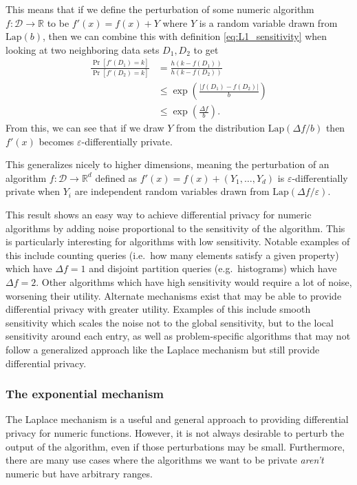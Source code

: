 \documentclass[a4paper,12pt]{article}
\newcommand{\fancy}{\mathcal}
\renewcommand{\epsilon}{\varepsilon}
\begin{document}
This means that if we define the perturbation of some numeric algorithm $f: \fancy{D} \to \mathbb{R}$ to be $f'(x) = f(x)+Y$ where $Y$ is a random variable drawn from $\text{Lap}(b)$, then we can combine this with definition \ref{eq:L1_sensitivity} when looking at two neighboring data sets $D_1,D_2$ to get
\begin{align*}
    \frac{\Pr[f'(D_1)=k]}{\Pr[f'(D_2)=k]} &= \frac{h(k - f(D_1))}{h(k - f(D_2))} \\
        &\leq \exp\left( \frac{|f(D_1)-f(D_2)|}{b}\right) \\
        &\leq \exp\left(\frac{\Delta f}{b}\right).
\end{align*}
From this, we can see that if we draw $Y$ from the distribution $\text{Lap}(\Delta f/b)$ then $f'(x)$ becomes $\epsilon$-differentially private.

This generalizes nicely to higher dimensions, meaning the perturbation of an algorithm $f : \fancy{D} \to \mathbb{R}^d$ defined as $f'(x) = f(x) + (Y_1,\dots,Y_d)$ is $\epsilon$-differentially private when $Y_i$ are independent random variables drawn from $\text{Lap}(\Delta f / \epsilon)$. 

This result shows an easy way to achieve differential privacy for numeric algorithms by adding noise proportional to the sensitivity of the algorithm. This is particularly interesting for algorithms with low sensitivity. Notable examples of this include counting queries (i.e.\ how many elements satisfy a given property) which have $\Delta f=1$ and disjoint partition queries (e.g.\ histograms) which have $\Delta f=2$. Other algorithms which have high sensitivity would require a lot of noise, worsening their utility. Alternate mechanisms exist that may be able to provide differential privacy with greater utility. Examples of this include smooth sensitivity \cite{nissim_smoothsens} which scales the noise not to the global sensitivity, but to the local sensitivity around each entry, as well as problem-specific algorithms that may not follow a generalized approach like the Laplace mechanism but still provide differential privacy.

\subsubsection{The exponential mechanism}

The Laplace mechanism is a useful and general approach to providing differential privacy for numeric functions. However, it is not always desirable to perturb the output of the algorithm, even if those perturbations may be small. Furthermore, there are many use cases where the algorithms we want to be private \emph{aren't} numeric but have arbitrary ranges.
\end{document}
